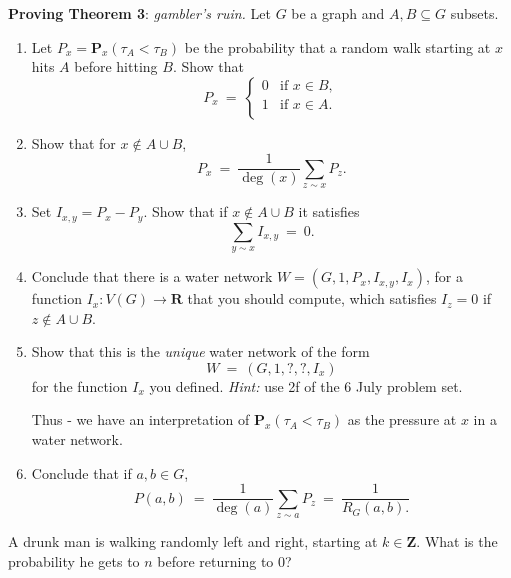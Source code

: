 \documentclass[11pt,fleqn]{book} %
\begin{document}
\begin{problem} \textbf{Proving Theorem 3}: \textit{gambler's ruin.} Let $G$ be a graph and $A,B \subseteq G$ subsets. 
\begin{enumerate}[label =\alph*.]
 \item Let $P_x=\mathbf{P}_x(\tau_A < \tau_B)$ be the probability that a random walk starting at $x$ hits $A$ before hitting $B$. Show that 
 $$P_x \ = \ \begin{cases}
    0 & \text{if } x\in B,\\
    1 & \text{if } x\in A.\\
 \end{cases}$$
 \item Show that for $x \not \in A \cup B$,
  $$P_x \ = \ \frac{1}{\deg (x)}\sum_{z\sim x} P_z.$$ 
 \item Set $I_{x,y}=P_x-P_y$. Show that if $x \not \in A \cup B$ it satisfies 
 $$\sum_{y\sim x}I_{x,y} \ = \  0.$$
 \item Conclude that there is a water network $W=(G,1,P_x,I_{x,y},I_x)$, for a function $I_x: V(G) \to \mathbf{R}$ that you should compute, which satisfies $I_z=0$ if $z\not\in A\cup B$.
 \item Show that this is the \textit{unique} water network of the form
  $$W \ = \ (G,1,?,?,I_x)$$
  for the function $I_x$ you defined. \textit{Hint:} use 2f of the 6 July problem set.

  Thus - we have an interpretation of $\mathbf{P}_x(\tau_A < \tau_B)$ as the pressure at $x$ in a water network.
 \item Conclude that if $a,b\in G$, 
  $$P(a,b) \ = \ \frac{1}{\deg(a)}\sum_{z\sim a}P_z \ = \ \frac{1}{R_G(a,b).}$$
\end{enumerate}
\end{problem}



\begin{problem}A drunk man is walking randomly left and right, starting at $k\in \mathbf{Z}$. What is the probability he gets to $n$ before returning to $0$? 
    \begin{center}
    \end{center}
\end{problem}
\end{document}
